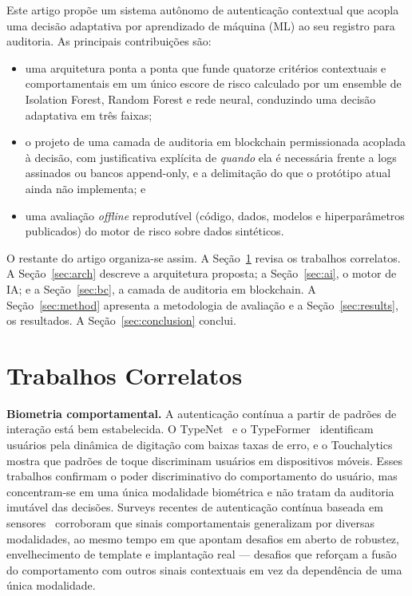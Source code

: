 \documentclass[conference]{IEEEtran}
\begin{document}
Este artigo propõe um sistema autônomo de autenticação contextual que
acopla uma decisão adaptativa por aprendizado de máquina (ML) ao seu
registro para auditoria. As principais contribuições são:
\begin{itemize}
  \item uma arquitetura ponta a ponta que funde quatorze critérios
        contextuais e comportamentais em um único escore de risco
        calculado por um ensemble de Isolation Forest, Random Forest e
        rede neural, conduzindo uma decisão adaptativa em três faixas;
  \item o projeto de uma camada de auditoria em blockchain
        permissionada acoplada à decisão, com justificativa explícita
        de \emph{quando} ela é necessária frente a logs assinados ou
        bancos append-only, e a delimitação do que o protótipo atual
        ainda não implementa; e
  \item uma avaliação \emph{offline} reprodutível (código, dados,
        modelos e hiperparâmetros publicados) do motor de risco sobre
        dados sintéticos.
\end{itemize}

O restante do artigo organiza-se assim. A Seção~\ref{sec:related} revisa
os trabalhos correlatos. A Seção~\ref{sec:arch} descreve a arquitetura
proposta; a Seção~\ref{sec:ai}, o motor de IA; e a Seção~\ref{sec:bc}, a
camada de auditoria em blockchain. A Seção~\ref{sec:method} apresenta a
metodologia de avaliação e a Seção~\ref{sec:results}, os resultados. A
Seção~\ref{sec:conclusion} conclui.

\section{Trabalhos Correlatos}
\label{sec:related}
\textbf{Biometria comportamental.} A autenticação contínua a partir de
padrões de interação está bem estabelecida. O TypeNet~\cite{acien2022} e
o TypeFormer~\cite{stragapede2024} identificam usuários pela dinâmica de
digitação com baixas taxas de erro, e o Touchalytics~\cite{frank2013}
mostra que padrões de toque discriminam usuários em dispositivos móveis.
Esses trabalhos confirmam o poder discriminativo do comportamento do
usuário, mas concentram-se em uma única modalidade biométrica e não
tratam da auditoria imutável das decisões. Surveys recentes de
autenticação contínua baseada em sensores~\cite{abuhamad2021} corroboram
que sinais comportamentais generalizam por diversas modalidades, ao
mesmo tempo em que apontam desafios em aberto de robustez, envelhecimento
de template e implantação real --- desafios que reforçam a fusão do
comportamento com outros sinais contextuais em vez da dependência de uma
única modalidade.
\end{document}
